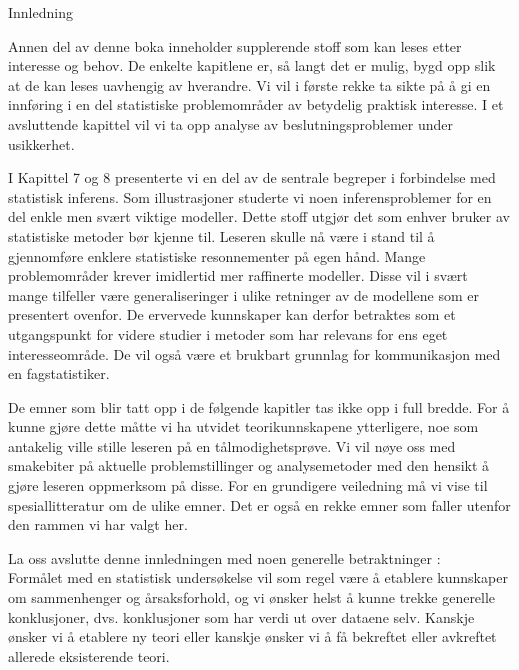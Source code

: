 
\setcounter{page}{291}
\mbox{} \vspace{2cm}
\begin{center}
{\huge Innledning}
\end{center}
\vspace{1cm}

Annen del av denne boka inneholder supplerende stoff som kan leses etter
interesse og behov.  De enkelte kapitlene er, så langt det er 
mulig, bygd opp slik at de kan leses uavhengig av hverandre.  Vi vil
i første rekke ta sikte på å gi en innføring i en del
statistiske problemområder av betydelig praktisk interesse.  I et
avsluttende kapittel vil vi ta opp analyse av beslutningsproblemer
under usikkerhet.

I Kapittel 7 og 8 presenterte vi en del av de sentrale begreper i
forbindelse med statistisk inferens.  Som illustrasjoner studerte vi
noen inferensproblemer for en del enkle men svært viktige modeller.
Dette stoff utgjør det som enhver bruker av statistiske metoder bør
kjenne til.  Leseren skulle nå være i stand til å 
gjennomføre enklere statistiske resonnementer på egen hånd.
Mange problemområder krever imidlertid mer raffinerte modeller.  
Disse vil i svært mange tilfeller være generaliseringer i
ulike retninger av de modellene som er presentert ovenfor.  De ervervede
kunnskaper kan derfor betraktes som et utgangspunkt for videre studier
i metoder som har relevans for ens eget interesseområde.  De vil
også være et brukbart grunnlag for kommunikasjon med en 
fagstatistiker.  

De emner som blir tatt opp i de følgende kapitler tas ikke opp i full
bredde.  For å kunne gjøre dette måtte vi ha utvidet 
teorikunnskapene ytter\-ligere, noe som antakelig ville stille leseren 
på en tålmodighetsprøve.  Vi vil nøye oss med smakebiter
på aktuelle problemstillinger og analyse\-metoder med den hensikt å
gjøre leseren oppmerksom på disse.  For en grundigere veiledning
må vi vise til spesiallitteratur om de ulike emner.  Det er også
en rekke emner som faller utenfor den rammen vi har valgt her.

La oss avslutte denne innledningen med noen generelle 
betraktninger : \\
Formålet med en statistisk undersøkelse vil som
regel være å etablere kunn\-skaper om sammenhenger og 
årsaksforhold, og vi ønsker helst å kunne trekke generelle
konklusjoner, dvs. konklusjoner som har verdi ut over dataene selv.
Kanskje ønsker vi å etablere ny teori eller kanskje ønsker
vi å få bekreftet eller avkreftet allerede eksisterende teori.

